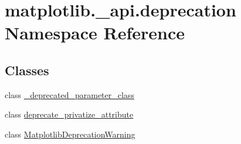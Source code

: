 \hypertarget{namespacematplotlib_1_1__api_1_1deprecation}{}\section{matplotlib.\+\_\+api.\+deprecation Namespace Reference}
\label{namespacematplotlib_1_1__api_1_1deprecation}
\subsection*{Classes}
\begin{DoxyCompactItemize}
\item 
class \hyperlink{classmatplotlib_1_1__api_1_1deprecation_1_1__deprecated__parameter__class}{\+\_\+deprecated\+\_\+parameter\+\_\+class}
\item 
class \hyperlink{classmatplotlib_1_1__api_1_1deprecation_1_1deprecate__privatize__attribute}{deprecate\+\_\+privatize\+\_\+attribute}
\item 
class \hyperlink{classmatplotlib_1_1__api_1_1deprecation_1_1MatplotlibDeprecationWarning}{Matplotlib\+Deprecation\+Warning}
\end{DoxyCompactItemize}
